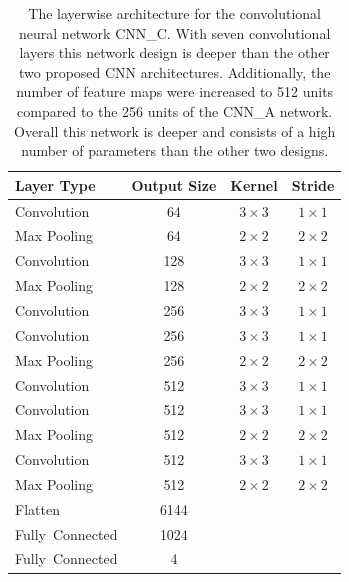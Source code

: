   \begin{table}[]
  \centering
  \begin{tabularx}{\textwidth}{Xccc}
  \toprule
Layer Type              & Output Size  & Kernel & Stride \\ \midrule
Convolution             & 64     & $3\times3$    & $1\times1$  \\ 
Max Pooling             & 64     & $2\times2$    & $2\times2$  \\ 
Convolution             & 128    & $3\times3$    & $1\times1$  \\ 
Max Pooling             & 128    & $2\times2$    & $2\times2$  \\ 
Convolution             & 256    & $3\times3$    & $1\times1$  \\ 
Convolution             & 256    & $3\times3$    & $1\times1$  \\ 
Max Pooling             & 256    & $2\times2$    & $2\times2$  \\ 
Convolution             & 512    & $3\times3$    & $1\times1$  \\ 
Convolution             & 512    & $3\times3$    & $1\times1$  \\ 
Max Pooling             & 512    & $2\times2$    & $2\times2$  \\ 
Convolution             & 512    & $3\times3$    & $1\times1$  \\ 
Max Pooling             & 512    & $2\times2$    & $2\times2$  \\ 
Flatten                 & 6144   &               &             \\
\mbox{Fully Connected}  & 1024   &               &             \\
\mbox{Fully Connected}  & 4      &               &             \\
  \bottomrule
  \end{tabularx}
  \caption{The layerwise architecture for the convolutional neural network CNN\_C. With seven convolutional layers this network design is deeper than the other two proposed CNN architectures. Additionally, the number of feature maps were increased to 512 units compared to the 256 units of the CNN\_A network. Overall this network is deeper and consists of a high number of parameters than the other two designs.}
  \label{tab:layers_CNN_C}
  \end{table} 
    

